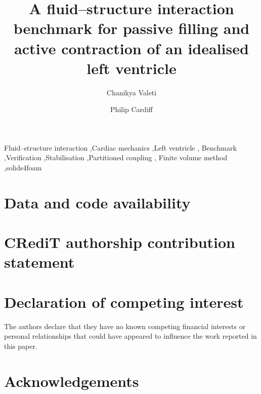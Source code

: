 \documentclass[preprint,12pt,authoryear]{elsarticle}
\begin{document}
\begin{frontmatter}

\title{A fluid--structure interaction benchmark for passive filling and
active contraction of an idealised left ventricle}

\author[ucd]{Chanikya Valeti}
\author[ucd]{Philip Cardiff}




\begin{keyword}
Fluid--structure interaction \sep Cardiac mechanics \sep Left ventricle \sep
Benchmark \sep Verification \sep Stabilisation \sep Partitioned coupling \sep
Finite volume method \sep solids4foam
\end{keyword}

\end{frontmatter}









\section*{Data and code availability}


\section*{CRediT authorship contribution statement}

\section*{Declaration of competing interest}
The authors declare that they have no known competing financial interests or
personal relationships that could have appeared to influence the work reported
in this paper.

\section*{Acknowledgements}

\appendix
{}





\end{document}
